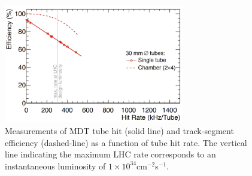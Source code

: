 \begin{figure}[!htb]
    \begin{center}
        \includegraphics[width=0.7\textwidth]{figures/nsw/nsw_mdt_track_reco_eff}
        \caption{
            Measurements of MDT tube hit (solid line) and track-segment efficiency (dashed-line)
            as a function of tube hit rate.
            The vertical line indicating the maximum LHC rate corresponds to an instantaneous
            luminosity of $1\times10^{34}$cm$^{-2}$s$^{-1}$.
        }
        \label{fig:nsw_mdt_track_reco}
    \end{center}
\end{figure}
